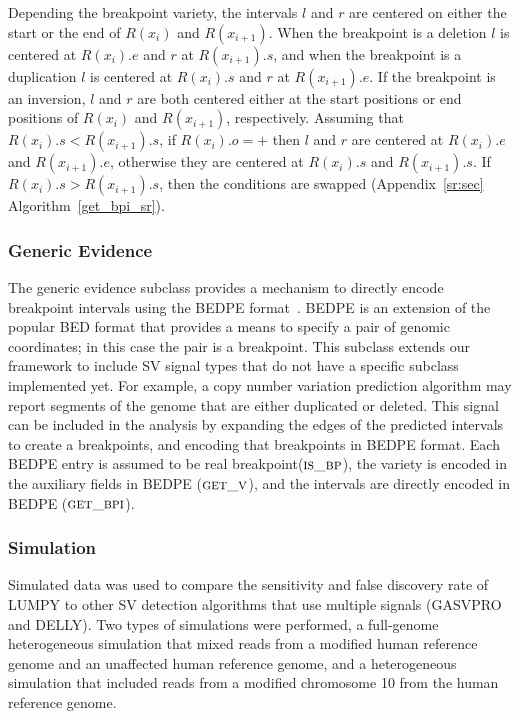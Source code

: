 \documentclass[10pt]{bmc_article}
\newenvironment{bmcformat}{\begin{raggedright}\baselineskip20pt\sloppy\setboolean{publ}{false}}{\end{raggedright}\baselineskip20pt\sloppy}
\begin{document}
\begin{bmcformat}
Depending the breakpoint variety, the intervals $l$ and $r$ are centered on
either the start or the end of $R(x_i)$ and $R(x_{i+1})$.  When the breakpoint
is a deletion $l$ is centered at $R(x_i).e$ and $r$ at $R(x_{i+1}).s$, and when
the breakpoint is a duplication $l$ is centered at $R(x_i).s$ and $r$ at
$R(x_{i+1}).e$.  If the breakpoint is an inversion, $l$ and $r$ are both
centered either at the start positions or end positions of $R(x_i)$ and
$R(x_{i+1})$, respectively.  Assuming that $R(x_i).s<R(x_{i+1}).s$, if
$R(x_i).o=+$ then $l$ and $r$ are centered at $R(x_i).e$ and  $R(x_{i+1}).e$,
otherwise they are centered at $R(x_i).s$ and  $R(x_{i+1}).s$.  If
$R(x_i).s>R(x_{i+1}).s$, then the conditions are swapped
(Appendix~\ref{sr:sec} Algorithm~\ref{get_bpi_sr}).

\subsubsection*{Generic Evidence}

The generic evidence subclass provides a mechanism to directly encode breakpoint
intervals using the BEDPE format~\cite{quinlan2010a}.  BEDPE is an extension of
the popular BED format that provides a means to specify a pair of genomic
coordinates; in this case the pair is a breakpoint.  This subclass extends our
framework to include SV signal types that do not have a specific subclass
implemented yet.  For example, a copy number variation prediction algorithm may
report segments of the genome that are either duplicated or deleted.  This
signal can be included in the analysis by expanding the edges of the predicted
intervals to create a breakpoints, and encoding that breakpoints in BEDPE
format.
Each BEDPE entry is assumed to be real breakpoint($\textsc{is\_bp}$), the
variety is encoded in the auxiliary fields in BEDPE ($\textsc{get\_v}$), and the
intervals are directly encoded in BEDPE ($\textsc{get\_bpi}$).


\subsubsection*{Simulation}
Simulated data was used to compare the sensitivity and false discovery rate of
LUMPY to other SV detection algorithms that use multiple signals (GASVPRO and
DELLY).   Two types of simulations were performed, a full-genome heterogeneous
simulation that mixed reads from a modified human reference genome and an
unaffected human reference genome, and a heterogeneous simulation that included
reads from a modified chromosome 10 from the human reference genome.


\end{bmcformat}
\end{document}
